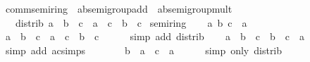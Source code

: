 \begin{isabellebody}
\isanewline
\isanewline
{}\isamarkupfalse%
\ comm{\isacharunderscore}{\kern0pt}semiring\ {\isacharequal}{\kern0pt}\ ab{\isacharunderscore}{\kern0pt}semigroup{\isacharunderscore}{\kern0pt}add\ {\isacharplus}{\kern0pt}\ ab{\isacharunderscore}{\kern0pt}semigroup{\isacharunderscore}{\kern0pt}mult\ {\isacharplus}{\kern0pt}\isanewline
\ \ \ distrib{\isacharcolon}{\kern0pt}\ {\isachardoublequoteopen}{\isacharparenleft}{\kern0pt}a\ {\isacharplus}{\kern0pt}\ b{\isacharparenright}{\kern0pt}\ {\isacharasterisk}{\kern0pt}\ c\ {\isacharequal}{\kern0pt}\ a\ {\isacharasterisk}{\kern0pt}\ c\ {\isacharplus}{\kern0pt}\ b\ {\isacharasterisk}{\kern0pt}\ c{\isachardoublequoteclose}\isanewline
{}\isanewline
\isanewline
{}\isamarkupfalse%
\ semiring\isanewline
%
\isadelimproof
%
\endisadelimproof
%
\isatagproof
{}\isamarkupfalse%
\isanewline
\ \ \isamarkupfalse%
\ a\ b\ c\ {\isacharcolon}{\kern0pt}{\isacharcolon}{\kern0pt}\ {\isacharprime}{\kern0pt}a\isanewline
\ \ \isamarkupfalse%
\ {\isachardoublequoteopen}{\isacharparenleft}{\kern0pt}a\ {\isacharplus}{\kern0pt}\ b{\isacharparenright}{\kern0pt}\ {\isacharasterisk}{\kern0pt}\ c\ {\isacharequal}{\kern0pt}\ a\ {\isacharasterisk}{\kern0pt}\ c\ {\isacharplus}{\kern0pt}\ b\ {\isacharasterisk}{\kern0pt}\ c{\isachardoublequoteclose}\isanewline
\ \ \ \ \isamarkupfalse%
\ {\isacharparenleft}{\kern0pt}simp\ add{\isacharcolon}{\kern0pt}\ distrib{\isacharparenright}{\kern0pt}\isanewline
\ \ \isamarkupfalse%
\ {\isachardoublequoteopen}a\ {\isacharasterisk}{\kern0pt}\ {\isacharparenleft}{\kern0pt}b\ {\isacharplus}{\kern0pt}\ c{\isacharparenright}{\kern0pt}\ {\isacharequal}{\kern0pt}\ {\isacharparenleft}{\kern0pt}b\ {\isacharplus}{\kern0pt}\ c{\isacharparenright}{\kern0pt}\ {\isacharasterisk}{\kern0pt}\ a{\isachardoublequoteclose}\isanewline
\ \ \ \ \isamarkupfalse%
\ {\isacharparenleft}{\kern0pt}simp\ add{\isacharcolon}{\kern0pt}\ ac{\isacharunderscore}{\kern0pt}simps{\isacharparenright}{\kern0pt}\isanewline
\ \ \isamarkupfalse%
\ \isamarkupfalse%
\ {\isachardoublequoteopen}{\isasymdots}\ {\isacharequal}{\kern0pt}\ b\ {\isacharasterisk}{\kern0pt}\ a\ {\isacharplus}{\kern0pt}\ c\ {\isacharasterisk}{\kern0pt}\ a{\isachardoublequoteclose}\isanewline
\ \ \ \ \isamarkupfalse%
\ {\isacharparenleft}{\kern0pt}simp\ only{\isacharcolon}{\kern0pt}\ distrib{\isacharparenright}{\kern0pt}\isanewline
\ \ \isamarkupfalse%
\ \isamarkupfalse%

\end{isabellebody}
